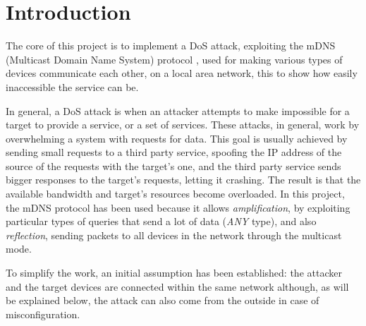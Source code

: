 \documentclass[fleqn, 11pt]{SelfArx} %
\affiliation{\textit{Department of Computer Engineering, University of Pavia, Pavia, Italy}} %
\affiliation{\textit{Enterprise Digital Infrastructure}} %
\begin{document}
\maketitle %

\tableofcontents %
\vfill\null

\thispagestyle{empty} %



\section{Introduction} %
The core of this project is to implement a DoS attack, exploiting the mDNS (Multicast Domain Name System) protocol \cite{rfc6762}, used for making various types of devices communicate each other, on a local area network, this to show how easily inaccessible the service can be. \newline

In general, a DoS attack is when an attacker attempts to make impossible for a target to provide a service, or a set of services. These attacks, in general, work by overwhelming a system with requests for data. \newline
This goal is usually achieved by sending small requests to a third party service, spoofing the IP address of the source of the requests with the target's one, and the third party service sends bigger responses to the target's requests, letting it crashing. \newline 
The result is that the available bandwidth and target's resources become overloaded.\newline
In this project, the mDNS protocol has been used because it allows \textit{amplification}, by exploiting particular types of queries that send a lot of data ({\it{ANY}} type), and also \textit{reflection}, sending packets to all devices in the network through the multicast mode. \newline

To simplify the work, an initial assumption has been established: the attacker and the target devices are connected within the same network although, as will be explained below, the attack can also come from the outside in case of misconfiguration.
\end{document}
